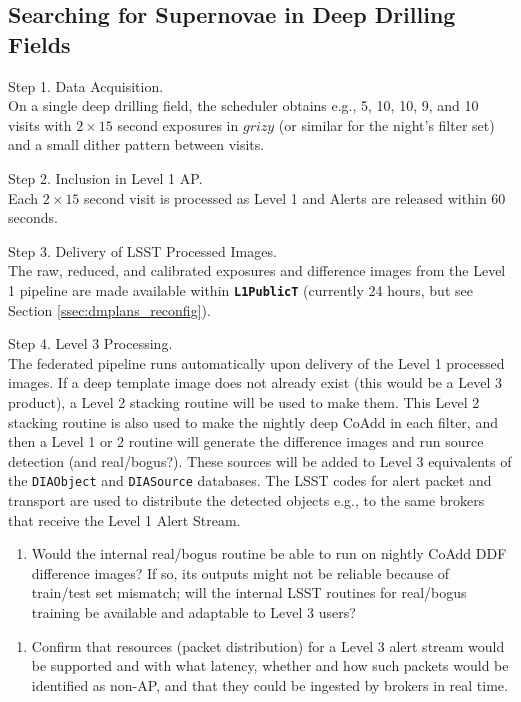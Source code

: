 \documentclass[DM,lsstdraft,toc]{lsstdoc}
\begin{document}
\subsection{Searching for Supernovae in Deep Drilling Fields}\label{ssec:SPCS_SNDDF}

Step 1. Data Acquisition. \\ On a single deep drilling field, the scheduler obtains e.g., 5, 10, 10, 9, and 10 visits with $2\times15$ second exposures in $grizy$ (or similar for the night's filter set) and a small dither pattern between visits.

Step 2. Inclusion in Level 1 AP. \\ Each $2\times15$ second visit is processed as Level 1 and Alerts are released within 60 seconds.

Step 3. Delivery of LSST Processed Images. \\ The raw, reduced, and calibrated exposures and difference images from the Level 1 pipeline are made available within {\tt \textbf{L1PublicT}} (currently 24 hours, but see Section \ref{ssec:dmplans_reconfig}).

Step 4. Level 3 Processing. \\ The federated pipeline runs automatically upon delivery of the Level 1 processed images. If a deep template image does not already exist (this would be a Level 3 product), a Level 2 stacking routine will be used to make them. This Level 2 stacking routine is also used to make the nightly deep CoAdd in each filter, and then a Level 1 or 2 routine will generate the difference images and run source detection (and real/bogus?). These sources will be added to Level 3 equivalents of the {\tt DIAObject} and {\tt DIASource} databases. The LSST codes for alert packet and transport are used to distribute the detected objects e.g., to the same brokers that receive the Level 1 Alert Stream. 
\begin{enumerate}[resume,topsep=-10pt,label= \textbf{Concern \Roman*.}] \item \label{C16} Would the internal real/bogus routine be able to run on nightly CoAdd DDF difference images? If so, its outputs might not be reliable because of train/test set mismatch; will the internal LSST routines for real/bogus training be available and adaptable to Level 3 users? \end{enumerate}
\begin{enumerate}[resume,topsep=-10pt,label= \textbf{Concern \Roman*.}] \item \label{C16a} Confirm that resources (packet distribution) for a Level 3 alert stream would be supported and with what latency, whether and how such packets would be identified as non-AP, and that they could be ingested by brokers in real time. \end{enumerate}
\end{document}
